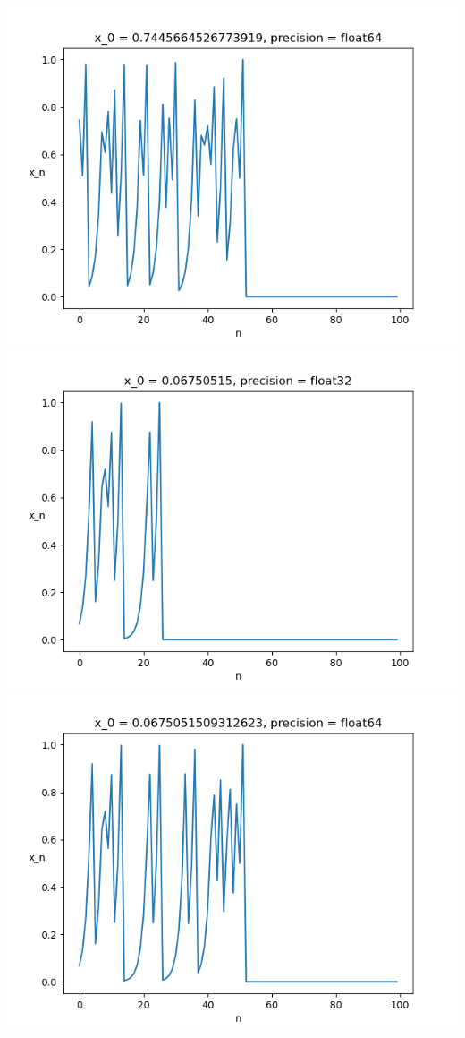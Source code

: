 \documentclass{article}
\begin{document}
\begin{enumerate}
\begin{enumerate}
\begin{center}
			\includegraphics[scale=.4]{hw1 run = 1, precision = float64}
			\includegraphics[scale=.4]{hw1 run = 2, precision = float32}
			\includegraphics[scale=.4]{hw1 run = 2, precision = float64}

\end{center}
\end{enumerate}
\end{enumerate}
\end{document}
